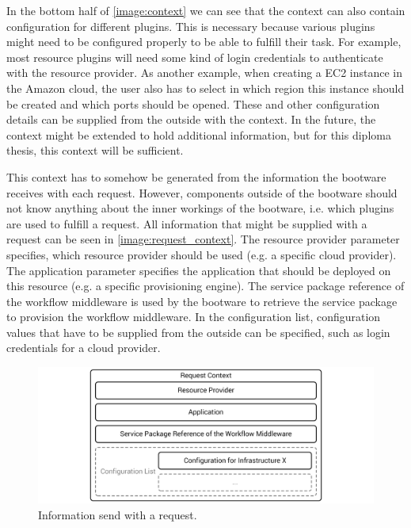 In the bottom half of \autoref{image:context} we can see that the context can also contain configuration for different plugins.
This is necessary because various plugins might need to be configured properly to be able to fulfill their task.
For example, most resource plugins will need some kind of login credentials to authenticate with the resource provider.
As another example, when creating a EC2 instance in the Amazon cloud, the user also has to select in which region this instance should be created and which ports should be opened.
These and other configuration details can be supplied from the outside with the context.
In the future, the context might be extended to hold additional information, but for this diploma thesis, this context will be sufficient.

This context has to somehow be generated from the information the bootware receives with each request.
However, components outside of the bootware should not know anything about the inner workings of the bootware, i.e. which plugins are used to fulfill a request.
All information that might be supplied with a request can be seen in \autoref{image:request_context}.
The resource provider parameter specifies, which resource provider should be used (e.g. a specific cloud provider).
The application parameter specifies the application that should be deployed on this resource (e.g. a specific provisioning engine).
The service package reference of the workflow middleware is used by the bootware to retrieve the service package to provision the workflow middleware.
In the configuration list, configuration values that have to be supplied from the outside can be specified, such as login credentials for a cloud provider.

\begin{figure}[!htbp]
	\centering
	\includegraphics[resolution=600]{design/assets/request_context}
	\caption{Information send with a request.}
	\label{image:request_context}
\end{figure}

